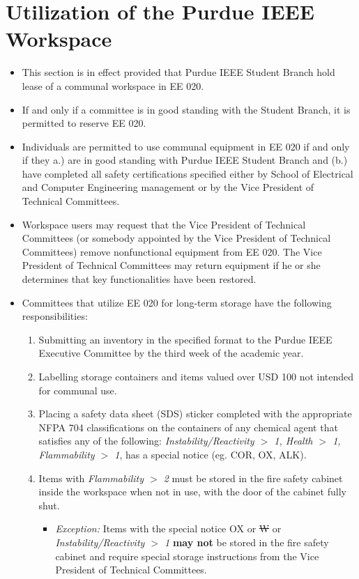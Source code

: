 \documentclass[12pt]{constitution}
\begin{document}
\section{Utilization of the Purdue IEEE Workspace}
\label{sec:tech_workspace}
\begin{itemize}
    \item This section is in effect provided that Purdue IEEE Student Branch hold lease of a communal workspace in EE 020.
    \item If and only if a committee is in good standing with the Student Branch, it is permitted to reserve EE 020.
    \item Individuals are permitted to use communal equipment in EE 020 if and only if they a.) are in good standing with Purdue IEEE Student Branch and (b.) have completed all safety certifications specified either by School of Electrical and Computer Engineering management or by the Vice President of Technical Committees.
    \item Workspace users may request that the Vice President of Technical Committees (or somebody appointed by the Vice President of Technical Committees) remove nonfunctional equipment from EE 020. The Vice President of Technical Committees may return equipment if he or she determines that key functionalities have been restored.
    \item Committees that utilize EE 020 for long-term storage have the following responsibilities:
    \begin{enumerate}
        \item Submitting an inventory in the specified format to the Purdue IEEE Executive Committee by the third week of the academic year.
        \item Labelling storage containers and items valued over USD 100 not intended for communal use.
        \item Placing a safety data sheet (SDS) sticker completed with the appropriate NFPA 704 classifications on the containers of any chemical agent that satisfies any of the following: \emph{Instability/Reactivity $>$ 1, Health $>$ 1, Flammability $>$ 1}, has a special notice (eg. COR, OX, ALK).
        \item Items with \emph{Flammability $>$ 2} must be stored in the fire safety cabinet inside the workspace when not in use, with the door of the cabinet fully shut.
        \begin{itemize}
            \item \emph{Exception:} Items with the special notice OX or \st{W} or \emph{Instability/Reactivity $>$ 1} \textbf{may not} be stored in the fire safety cabinet and require special storage instructions from the Vice President of Technical Committees.

\end{itemize}
\end{enumerate}
\end{itemize}
\end{document}
